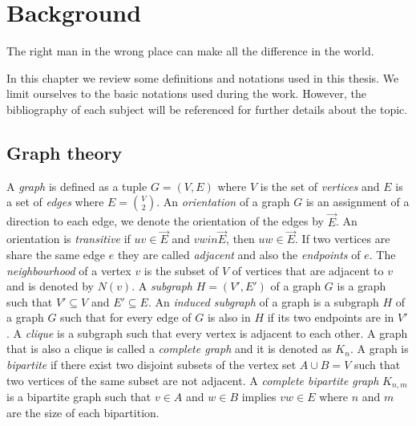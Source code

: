 \chapter{Background}
\label{chap:background}

\begin{fquote}
  The right man in the wrong place can make all the difference in the world.
\end{fquote}

In this chapter we review some definitions and notations used in this thesis. We limit ourselves to the basic notations used during the work. However, the bibliography of each subject will be referenced for further details about the topic.


%
%
%

\section{Graph theory}

A \emph{graph} is defined as a tuple $G = (V,E)$ where $V$ is the set of \emph{vertices} and $E$ is a set of \emph{edges} where $E = \binom{V}{2}$. An \emph{orientation} of a graph $G$ is an assignment of a direction to each edge, we denote the orientation of the edges by $\overrightarrow{E}$. An orientation is \emph{transitive} if $uv \in \overrightarrow{E}$ and $vw in \overrightarrow{E}$, then $uw \in \overrightarrow{E}$. If two vertices are share the same edge $e$ they are called \emph{adjacent} and also the \emph{endpoints} of $e$. The \emph{neighbourhood} of a vertex $v$ is the subset of $V$ of vertices that are adjacent to $v$ and is denoted by $N(v)$. A \emph{subgraph} $H = (V', E')$ of a graph $G$ is a graph such that $V' \subseteq V$ and $E' \subseteq E$. An \emph{induced subgraph} of a graph is a subgraph $H$ of a graph $G$ such that for every edge of $G$ is also in $H$ if its two endpoints are in $V'$. A \emph{clique} is a subgraph such that every vertex is adjacent to each other. A graph that is also a clique is called a \emph{complete graph} and it is denoted as $K_n$. A graph is \emph{bipartite} if there exist two disjoint subsets of the vertex set $A \cup B = V$ such that two vertices of the same subset are not adjacent. A \emph{complete bipartite graph} $K_{n,m}$ is a bipartite graph such that $v \in A$ and $w \in B$ implies $vw \in E$ where $n$ and $m$ are the size of each bipartition.

